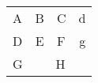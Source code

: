 \documentclass[]{article}
\begin{document}
	\begin{center}
		\begin{tabular}[c]{|l|c|p{3em}|r|} \hline \hline
			A & B & C & d \\
			D & E & F & g \\
			\cline{2-3}
			G & \multicolumn{3}{|c|}{H} \\
			\hline
		\end{tabular}
	\end{center}
\end{document}
